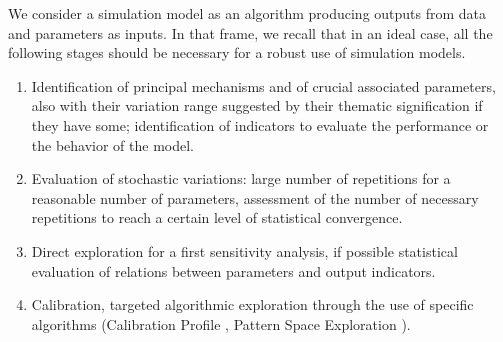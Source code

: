 \documentclass[10pt]{article}
\begin{document}
We consider a simulation model as an algorithm producing outputs from data and parameters as inputs. In that frame, we recall that in an ideal case, all the following stages should be necessary for a robust use of simulation models.

\begin{enumerate}
	\item Identification of principal mechanisms and of crucial associated parameters, also with their variation range suggested by their thematic signification if they have some; identification of indicators to evaluate the performance or the behavior of the model.
	\item Evaluation of stochastic variations: large number of repetitions for a reasonable number of parameters, assessment of the number of necessary repetitions to reach a certain level of statistical convergence.
	\item Direct exploration for a first sensitivity analysis, if possible statistical evaluation of relations between parameters and output indicators.
	\item Calibration, targeted algorithmic exploration through the use of specific algorithms (Calibration Profile \citep{reuillon2015new}, Pattern Space Exploration \citep{10.1371/journal.pone.0138212}).

\end{enumerate}
\end{document}
